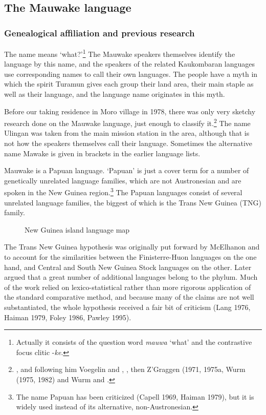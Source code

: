 \subsection{The Mauwake language}
\hypertarget{RefHeading18561935131865}{}\subsubsection{Genealogical affiliation and previous research}
\hypertarget{RefHeading18581935131865}{}The name  means `what?'\footnote{Actually it consists of the question word \textit{mauwa} `what' and the contrastive focus clitic -\textit{ke}.}  The Mauwake speakers themselves identify the language by this name, and the speakers of the related Kaukombaran languages use corresponding names to call their own languages.  The people have a myth in which the spirit Turamun gives each group their land area, their main staple as well as their language, and the language name originates in this myth.

Before our taking residence in Moro village in 1978, there was only very sketchy research done on the Mauwake language, just enough to classify it.\footnote{\citet{Capell1952}, and following him Voegelin and \citet{Voegelin1965}, \citet{Greenberg1971}, then Z'Graggen (1971, 1975a, Wurm (1975, 1982) and Wurm and \citet{Hattori1981}.} The name Ulingan was taken from the main mission station in the area, although that is not how the speakers themselves call their language. Sometimes the alternative name Mawake is given in brackets in the earlier language lists.  

Mauwake is a Papuan language. `Papuan' is just a cover term for a number of genetically unrelated language families, which are not Austronesian and are spoken in the New Guinea region.\footnote{The name Papuan has been criticized (Capell 1969, Haiman 1979), but it is widely used instead of its alternative, non-Austronesian.} The Papuan languages consist of several unrelated language families, the biggest of which is the Trans New Guinea (TNG) family.  


\begin{figure}
\caption{New Guinea island language map \citep[34]{Ross2005}}
\label{fig:map:2}
\end{figure}

The Trans New Guinea hypothesis was originally put forward by McElhanon and \citet{Voorhoeve1970} to account for the similarities between the Finisterre-Huon languages on the one hand, and Central and South New Guinea Stock languages on the other. Later \citet{Wurm1975} argued that a great number of additional languages belong to the phylum.  Much of the work relied on lexico-statistical rather than more rigorous application of the standard comparative method, and because many of the claims are not well substantiated, the whole  hypothesis received a fair bit of criticism (Lang 1976, Haiman 1979, Foley 1986, Pawley 1995).

